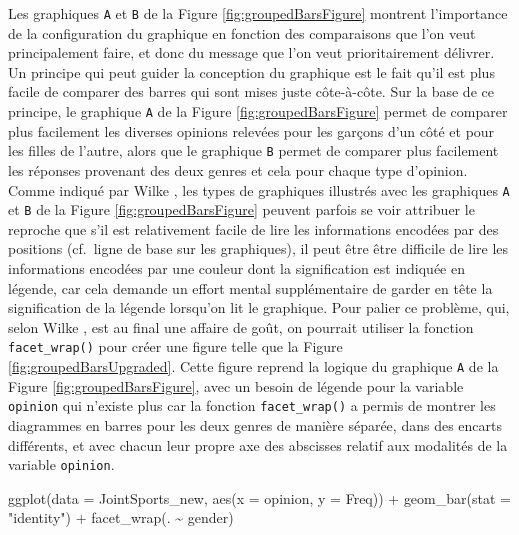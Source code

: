 \documentclass[
]{book}
\newenvironment{Shaded}{\begin{snugshade}}{\end{snugshade}}
\newcommand{\AttributeTok}[1]{\textcolor[rgb]{0.77,0.63,0.00}{#1}}
\newcommand{\FunctionTok}[1]{\textcolor[rgb]{0.00,0.00,0.00}{#1}}
\newcommand{\NormalTok}[1]{#1}
\newcommand{\SpecialCharTok}[1]{\textcolor[rgb]{0.00,0.00,0.00}{#1}}
\newcommand{\StringTok}[1]{\textcolor[rgb]{0.31,0.60,0.02}{#1}}
\begin{document}
Les graphiques \texttt{A} et \texttt{B} de la Figure \ref{fig:groupedBarsFigure} montrent l'importance de la configuration du graphique en fonction des comparaisons que l'on veut principalement faire, et donc du message que l'on veut prioritairement délivrer. Un principe qui peut guider la conception du graphique est le fait qu'il est plus facile de comparer des barres qui sont mises juste côte-à-côte. Sur la base de ce principe, le graphique \texttt{A} de la Figure \ref{fig:groupedBarsFigure} permet de comparer plus facilement les diverses opinions relevées pour les garçons d'un côté et pour les filles de l'autre, alors que le graphique \texttt{B} permet de comparer plus facilement les réponses provenant des deux genres et cela pour chaque type d'opinion. Comme indiqué par Wilke \autocite*{wilkeFundamentalsDataVisualization2018}, les types de graphiques illustrés avec les graphiques \texttt{A} et \texttt{B} de la Figure \ref{fig:groupedBarsFigure} peuvent parfois se voir attribuer le reproche que s'il est relativement facile de lire les informations encodées par des positions (cf.~ligne de base sur les graphiques), il peut être être difficile de lire les informations encodées par une couleur dont la signification est indiquée en légende, car cela demande un effort mental supplémentaire de garder en tête la signification de la légende lorsqu'on lit le graphique. Pour palier ce problème, qui, selon Wilke \autocite*{wilkeFundamentalsDataVisualization2018}, est au final une affaire de goût, on pourrait utiliser la fonction \texttt{facet\_wrap()} pour créer une figure telle que la Figure \ref{fig:groupedBarsUpgraded}. Cette figure reprend la logique du graphique \texttt{A} de la Figure \ref{fig:groupedBarsFigure}, avec un besoin de légende pour la variable \texttt{opinion} qui n'existe plus car la fonction \texttt{facet\_wrap()} a permis de montrer les diagrammes en barres pour les deux genres de manière séparée, dans des encarts différents, et avec chacun leur propre axe des abscisses relatif aux modalités de la variable \texttt{opinion}.

\begin{Shaded}
\begin{Highlighting}[]
\FunctionTok{ggplot}\NormalTok{(}\AttributeTok{data =}\NormalTok{ JointSports\_new, }\FunctionTok{aes}\NormalTok{(}\AttributeTok{x =}\NormalTok{ opinion, }\AttributeTok{y =}\NormalTok{ Freq)) }\SpecialCharTok{+}
  \FunctionTok{geom\_bar}\NormalTok{(}\AttributeTok{stat =} \StringTok{"identity"}\NormalTok{) }\SpecialCharTok{+}
  \FunctionTok{facet\_wrap}\NormalTok{(. }\SpecialCharTok{\textasciitilde{}}\NormalTok{ gender)}
\end{Highlighting}
\end{Shaded}
\end{document}

